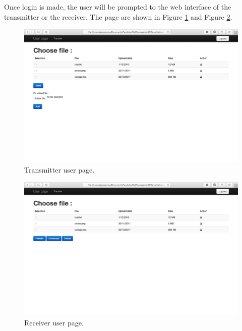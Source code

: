 \documentclass[a4paper,10pt]{article}
\begin{document}
Once login is made, the user will be prompted to the web interface of the transmitter or the receiver. The page are shown in Figure \ref{fig:transuserpage} and Figure \ref{fig:receiveruserpage}.


\begin{figure}[!h]
\centering
\includegraphics[scale=0.35]{images/usertransmitter.png}
\caption{Transmitter user page.}
\label{fig:transuserpage}
\end{figure}

\begin{figure}[!h]
\centering
\includegraphics[scale=0.35]{images/userreceiver.png}
\caption{Receiver user page.}
\label{fig:receiveruserpage}
\end{figure}
\end{document}
